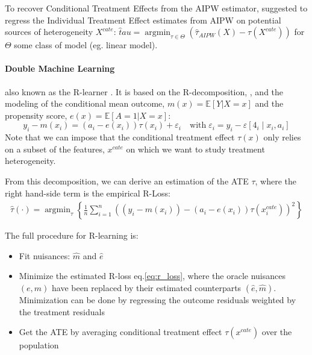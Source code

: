 \documentclass[french,12pt,twoside,a4paper]{book}
\DeclareMathOperator*{\argmin}{argmin} \def\mycitecolor{green!50!black}
\begin{document}
\begin{appendices}
\begin{background_box_left}
    To recover Conditional Treatment Effects from the AIPW estimator,
    \cite{foster2019orthogonal} suggested to regress the Individual Treatment
    Effect estimates from AIPW on potential sources of heterogeneity $X^{cate}$:
    $\hat tau = \argmin_{\tau \in \Theta} (\hat \tau_{AIPW}(X) - \tau(X^{cate}))$
    for $\Theta$ some class of model (eg. linear model).

    \paragraph{Double Machine Learning} \citep{chernozhukov2018double} also known
    as the R-learner \citep{nie2021quasi}. It is based on the R-decomposition,
    \citep{robinson1988root}, and the modeling of the conditional mean outcome,
    $m(x)=\mathbb E[Y|X=x]$ and the propensity score, $e(x)=\mathbb E[A=1|X=x]$:
    \begin{equation}\label{eq:r_decomposition_dml}
      y_{i}-m\left(x_{i}\right)=\left(a_{i}-e\left(x_{i}\right)\right) \tau\left(x_{i}\right)+\varepsilon_{i} \quad \text{with} \; \varepsilon_{i}=y_{i}-\varepsilon\left[4_{i} \mid x_{i}, a_{i}\right]
    \end{equation}
    Note that we can impose that the conditional treatment effect $\tau(x)$ only
    relies on a subset of the features, $x^{cate}$ on which we want to study
    treatment heterogeneity.

    From this decomposition, we can derive an estimation of the ATE $\tau$, where
    the right hand-side term is the empirical R-Loss:
    \begin{align}\label{eq:r_loss}
      \hat{\tau}(\cdot)=\operatorname{argmin}_{\tau}\left\{\frac{1}{n} \sum_{i=1}^{n}\left(\left(y_{i}-m\left(x_{i}\right)\right)-\left(a_{i}-e(x_{i})\right) \tau\left(x^{cate}_{i}\right)\right)^{2}\right\}
    \end{align}

    The full procedure for R-learning is:
    \begin{itemize}
      \item Fit nuisances: $\hat m$ and $\hat e$
      \item Minimize the estimated R-loss eq.\ref{eq:r_loss}, where the oracle nuisances $(e, m)$
            have been replaced by their estimated counterparts $(\hat e, \hat m)$.
            Minimization can be done by regressing the outcome residuals weighted by the
            treatment residuals
      \item Get the ATE by averaging conditional treatment effect $\tau(x^{cate})$ over the population
    \end{itemize}


\end{background_box_left}
\end{appendices}
\end{document}
